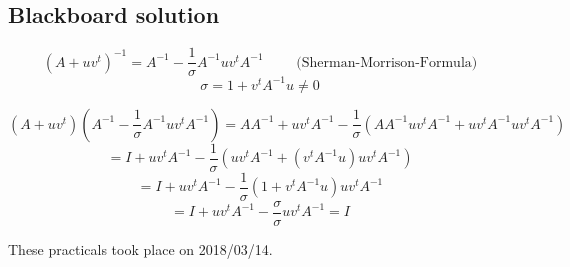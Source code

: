 \documentclass[a4paper]{article}
\theoremstyle{definition}
\newcommand\dateref[1]{These practicals took place on #1.\par}
\begin{document}
\subsection{Blackboard solution}

\[ (A + uv^t)^{-1} = A^{-1} - \frac1\sigma A^{-1} uv^t A^{-1} \qquad \text{ (Sherman-Morrison-Formula)} \]
\[ \sigma = 1 + v^t A^{-1} u \neq 0 \]

\[ (A + uv^t)(A^{-1} - \frac1\sigma A^{-1} uv^t A^{-1}) = A A^{-1} + uv^t A^{-1} - \frac1\sigma (A A^{-1} uv^t A^{-1} + uv^t A^{-1} uv^t A^{-1}) \]
\[ = I + uv^t A^{-1} - \frac1\sigma (uv^t A^{-1} + (v^t A^{-1} u) uv^t A^{-1} )\]
\[ = I + uv^t A^{-1} - \frac1\sigma (1 + v^t A^{-1} u) uv^t A^{-1} \]
\[ = I + uv^t A^{-1} - \frac\sigma\sigma uv^t A^{-1} = I \]

\dateref{2018/03/14}
\end{document}
